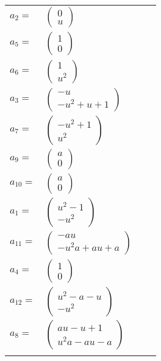\documentclass[1p]{elsarticle_modified}
\theoremstyle{definition}
\begin{document}
\begin{tabular}{m{7pt} m{180pt} m{7pt} m{180pt} }
\flushright $a_{2}=$&$\begin{pmatrix}0\\u\end{pmatrix}$ \\
\flushright $a_{5}=$&$\begin{pmatrix}1\\0\end{pmatrix}$ \\
\flushright $a_{6}=$&$\begin{pmatrix}1\\u^2\end{pmatrix}$ \\
\flushright $a_{3}=$&$\begin{pmatrix}- u\\- u^2+u+1\end{pmatrix}$ \\
\flushright $a_{7}=$&$\begin{pmatrix}- u^2+1\\u^2\end{pmatrix}$ \\
\flushright $a_{9}=$&$\begin{pmatrix}a\\0\end{pmatrix}$ \\
\flushright $a_{10}=$&$\begin{pmatrix}a\\0\end{pmatrix}$ \\
\flushright $a_{1}=$&$\begin{pmatrix}u^2-1\\- u^2\end{pmatrix}$ \\
\flushright $a_{11}=$&$\begin{pmatrix}- a u\\- u^2 a+a u+a\end{pmatrix}$ \\
\flushright $a_{4}=$&$\begin{pmatrix}1\\0\end{pmatrix}$ \\
\flushright $a_{12}=$&$\begin{pmatrix}u^2- a- u\\- u^2\end{pmatrix}$ \\
\flushright $a_{8}=$&$\begin{pmatrix}a u- u+1\\u^2 a- a u- a\end{pmatrix}$\\&\end{tabular}
\end{document}

